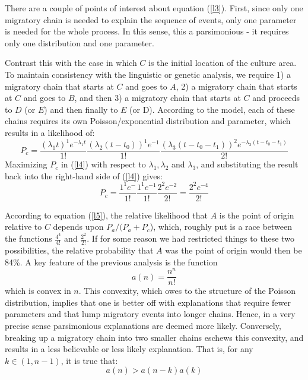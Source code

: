\documentclass[11pt]{article}
\begin{document}
There are a couple of points of interest about equation (\ref{l3}). First, since only one migratory chain is needed to explain the sequence of events, only one parameter is needed for the whole process. In this sense, this a parsimonious - it requires only one distribution and one parameter. 

Contrast this with the case in which $C$ is the initial location of the culture area. To maintain consistency with the linguistic or genetic analysis, we require 1) a migratory chain that starts at $C$ and goes to $A$, 2) a migratory chain that starts at $C$ and goes to $B$, and then 3) a migratory chain that starts at $C$ and proceeds to $D$ (or $E$) and then finally to $E$ (or D). According to the model, each of these chains requires its own Poisson/exponential distribution and parameter, which results in a likelihood of:
\begin{equation} \label{l4}
P_{c}=\frac{(\lambda_1t)^1e^{-\lambda_1t}}{1!}\frac{(\lambda_2(t-t_0))^1e^{-1}}{1!}
\frac{(\lambda_3(t-t_0-t_1))^2e^{-\lambda_3(t-t_0-t_1)}}{2!}
\end{equation} 
Maximizing $P_c$ in (\ref{l4}) with respect to $\lambda_1,\lambda_2$ and $\lambda_3$, and substituting the result back into the right-hand side of (\ref{l4}) gives:
\begin{equation} \label{l5}
P_{c}=\frac{1^1e^{-}}{1!}\frac{1^{1}e^{-1}}{1!}\frac{2^2e^{-2}}{2!}=
\frac{2^2e^{-4}}{2!}
\end{equation} 

According to equation (\ref{l5}), the relative likelihood that $A$ is the point of origin relative to $C$ depends upon $P_a /(P_a+P_c$), which, roughly put is a race between the functions $\frac{4^4}{4!}$ and $\frac{2^2}{2!}$. If for some reason we had restricted things to these two possibilities, the relative probability that $A$ was the point of origin would then be 84\%. 
A key feature of the previous analysis is the function 
\begin{equation*}
a(n)=\frac{n^n}{n!}
\end{equation*}
which is convex in $n$. This convexity, which owes to the structure of the Poisson distribution, implies that one is better off with explanations that require fewer parameters and that lump migratory events into longer chains. Hence, in a very precise sense parsimonious explanations are deemed more likely. Conversely, breaking up a migratory chain into two smaller chains eschews this convexity, and results in a less believable or less likely explanation. That is, for any  $k \in (1,n-1)$, it is true that:
\begin{equation*}
a(n) > a(n-k)a(k)
\end{equation*} 
\end{document}
